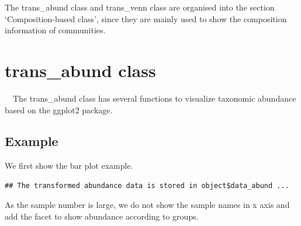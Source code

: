 \documentclass[
]{book}
\newenvironment{Shaded}{\begin{snugshade}}{\end{snugshade}}
\newcommand{\AttributeTok}[1]{\textcolor[rgb]{0.13,0.29,0.53}{#1}}
\newcommand{\CommentTok}[1]{\textcolor[rgb]{0.56,0.35,0.01}{\textit{#1}}}
\newcommand{\ConstantTok}[1]{\textcolor[rgb]{0.56,0.35,0.01}{#1}}
\newcommand{\DecValTok}[1]{\textcolor[rgb]{0.00,0.00,0.81}{#1}}
\newcommand{\FunctionTok}[1]{\textcolor[rgb]{0.13,0.29,0.53}{\textbf{#1}}}
\newcommand{\NormalTok}[1]{#1}
\newcommand{\OtherTok}[1]{\textcolor[rgb]{0.56,0.35,0.01}{#1}}
\newcommand{\SpecialCharTok}[1]{\textcolor[rgb]{0.81,0.36,0.00}{\textbf{#1}}}
\newcommand{\StringTok}[1]{\textcolor[rgb]{0.31,0.60,0.02}{#1}}
\begin{document}
The trans\_abund class and trans\_venn class are organised into the section `Composition-based class',
since they are mainly used to show the composition information of communities.

\section{trans\_abund class}\label{trans_abund-class}

　The trans\_abund class has several functions to visualize taxonomic abundance based on the ggplot2 package.

\subsection{Example}\label{example}

We first show the bar plot example.

\begin{Shaded}
\end{Shaded}

\begin{verbatim}
## The transformed abundance data is stored in object$data_abund ...
\end{verbatim}

\begin{Shaded}
\end{Shaded}

As the sample number is large, we do not show the sample names in x axis and add the facet to show abundance according to groups.

\begin{Shaded}
\end{Shaded}
\end{document}

